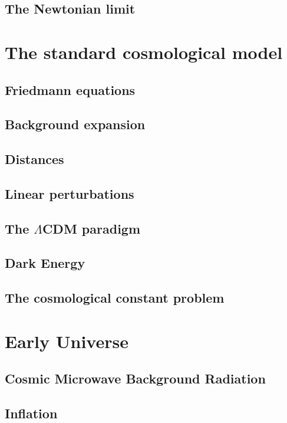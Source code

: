 \subsection{The Newtonian limit}


\section{The standard cosmological model}

\subsection{Friedmann equations}

\subsection{Background expansion}

\subsection{Distances}

\subsection{Linear perturbations}

\subsection{The $\Lambda$CDM paradigm}

\subsection{Dark Energy}

\subsection{The cosmological constant problem}





\section{Early Universe}

\subsection{Cosmic Microwave Background Radiation}

\subsection{Inflation}





